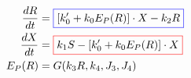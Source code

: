 \documentclass[preview]{standalone}
\begin{document}
\pagestyle{empty}
\begin{equation*}
\begin{aligned}
	\frac{dR}{dt} & = {\color{blue}\boxed{\color{black} [k_0' + k_0 E_P(R)] \cdot X - k_2 R}} \\ 
	\frac{dX}{dt} & = {\color{red}\boxed{\color{black} k_1 S - [k_0' + k_0 E_P(R)] \cdot X}} \\ 
	E_P(R) & = G(k_3 R, k_4, J_3, J_4)
\end{aligned}
\end{equation*}
\vfill
\end{document}
